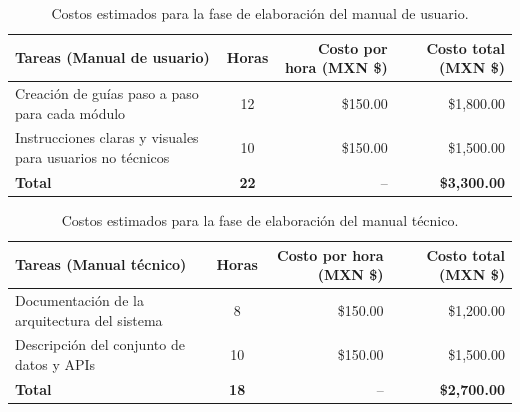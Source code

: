 \begin{table}[H]
	\centering
	\renewcommand{\arraystretch}{1.6}
	\setlength{\tabcolsep}{10pt}
	\Huge
	\begin{adjustbox}{max width=\textwidth}
		\begin{tabular}{|p{9.5cm}|c|r|r|}
			\hline
			\textbf{Tareas (Manual de usuario)} & \textbf{Horas} & \textbf{Costo por hora (MXN \$)} & \textbf{Costo total (MXN \$)} \\ \hline
			Creación de guías paso a paso para cada módulo & 12 & \$150.00 & \$1,800.00 \\ \hline
			Instrucciones claras y visuales para usuarios no técnicos & 10 & \$150.00 & \$1,500.00 \\ \hline
			\textbf{Total} & \textbf{22} & -- & \textbf{\$3,300.00} \\ \hline
		\end{tabular}
	\end{adjustbox}
	\caption{Costos estimados para la fase de elaboración del manual de usuario.}
	\label{tab:costos_manual_nuevo}
\end{table}

\begin{table}[H]
	\centering
	\renewcommand{\arraystretch}{1.6}
	\setlength{\tabcolsep}{10pt}
	\Huge
	\begin{adjustbox}{max width=\textwidth}
		\begin{tabular}{|p{9.5cm}|c|r|r|}
			\hline
			\textbf{Tareas (Manual técnico)} & \textbf{Horas} & \textbf{Costo por hora (MXN \$)} & \textbf{Costo total (MXN \$)} \\ \hline
			Documentación de la arquitectura del sistema & 8 & \$150.00 & \$1,200.00 \\ \hline
			Descripción del conjunto de datos y APIs & 10 & \$150.00 & \$1,500.00 \\ \hline
			\textbf{Total} & \textbf{18} & -- & \textbf{\$2,700.00} \\ \hline
		\end{tabular}
	\end{adjustbox}
	\caption{Costos estimados para la fase de elaboración del manual técnico.}
	\label{tab:costos_manual_tecnico_nuevo}
\end{table}

